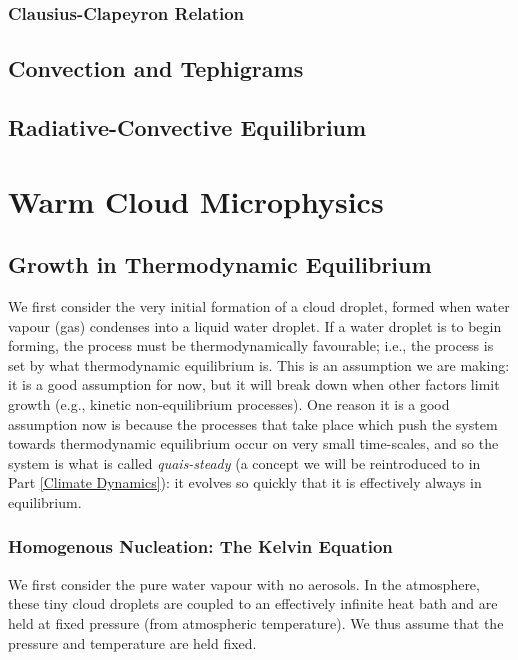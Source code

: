 \subsection{Clausius-Clapeyron Relation}

\section{Convection and Tephigrams}

\section{Radiative-Convective Equilibrium}\label{Radiative-Convective Equilibrium}

\chapter{Warm Cloud Microphysics}

\section{Growth in Thermodynamic Equilibrium}

We first consider the very initial formation of a cloud droplet, formed when water vapour (gas) condenses into a liquid water droplet. If a water droplet is to begin forming, the process must be thermodynamically favourable; i.e., the process is set by what thermodynamic equilibrium is. This is an assumption we are making: it is a good assumption for now, but it will break down when other factors limit growth (e.g., kinetic non-equilibrium processes). One reason it is a good assumption now is because the processes that take place which push the system towards thermodynamic equilibrium occur on very small time-scales, and so the system is what is called \textit{quais-steady} (a concept we will be reintroduced to in Part \ref{Climate Dynamics}): it evolves so quickly that it is effectively always in equilibrium.

\subsection{Homogenous Nucleation: The Kelvin Equation}

We first consider the pure water vapour with no aerosols. In the atmosphere, these tiny cloud droplets are coupled to an effectively infinite heat bath and are held at fixed pressure (from atmospheric temperature). We thus assume that the pressure and temperature are held fixed.

